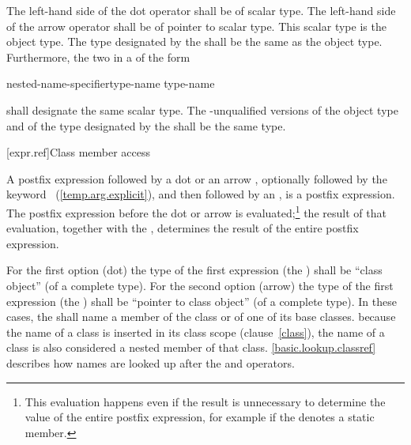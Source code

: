 \pnum
The left-hand side of the dot operator shall be of scalar type. The
left-hand side of the arrow operator shall be of pointer to scalar type.
This scalar type is the object type. The type designated by the
 shall be the same as the object type.
Furthermore,
the two  in a  of
the form

\begin{ncbnf}
\terminal{::}\opt nested-name-specifier\opt type-name \terminal{::\,\tilde} type-name
\end{ncbnf}

shall designate the same scalar type. The -unqualified
versions of the object type and of the type designated by the
 shall be the same type. 

[expr.ref]{Class member access}

\pnum
{}%
%
%
%
%
%
%
%
%
%
A postfix expression followed by a dot  or an arrow \tcode{->},
optionally followed by the keyword
~(\ref{temp.arg.explicit}), and then followed by an
, is a postfix expression. The postfix
expression before the dot or arrow is evaluated;\footnote{This
evaluation happens even if the result is unnecessary to determine
the value of the entire postfix expression, for example if the
 denotes a static member.}
the result of that evaluation, together with the
, determines the result of the entire postfix
expression.

\pnum
{}%
For the first option (dot) the type of the first expression (the
) shall be ``class object'' (of a complete
type). For the second option (arrow) the type of the first expression
(the ) shall be ``pointer to class object''
(of a complete type). In these cases, the
 shall name a member of the class or of one of
its base classes.
\enternote 
because the name of a class is inserted in its class scope
(clause~\ref{class}), the name of a class is also considered a nested
member of that class.
\exitnote 
\enternote
\ref{basic.lookup.classref} describes how names are looked up after the
 and \tcode{->} operators.
\exitnote 

